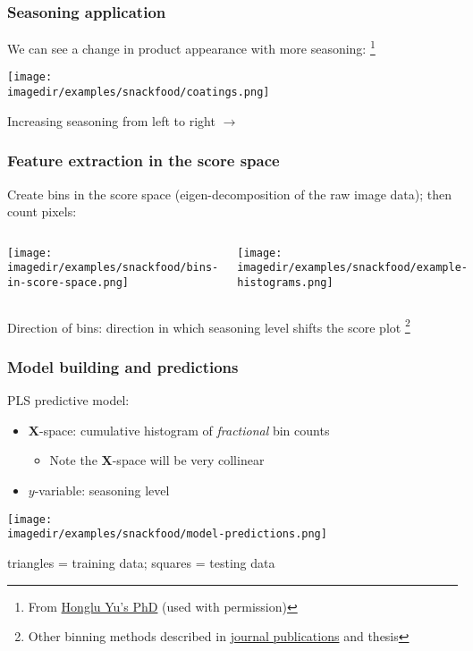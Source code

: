 \begin{frame}\frametitle{Seasoning application}
	We can see a change in product appearance with more seasoning:
	\footnote{From \href{http://literature.connectmv.com/item/60}{Honglu Yu's PhD} {\tiny (used with permission)}}
	\begin{center}
		\texttt{[image: \\imagedir/examples/snackfood/coatings.png]}
	\end{center}
	\vskip12pt
	Increasing seasoning from left to right $\longrightarrow$
\end{frame}

\begin{frame}\frametitle{Feature extraction in the score space {\color{myOrange}{(phase 1)}}}
	
	Create bins in the score space (eigen-decomposition of the raw image data); then count pixels:
	\begin{columns}
			\begin{center}
				\texttt{[image: \\imagedir/examples/snackfood/bins-in-score-space.png]}
			\end{center}
			\begin{center}
				\texttt{[image: \\imagedir/examples/snackfood/example-histograms.png]}
			\end{center}
	\end{columns}
	{\small Direction of bins: direction in which seasoning level shifts the score plot}
	\footnote{Other binning methods described in \href{http://literature.connectmv.com/item/119/}{journal publications} and thesis}
\end{frame}

\begin{frame}\frametitle{Model building and predictions {\color{myOrange}{(phase 1)}}}
	PLS predictive model:
	\begin{itemize}
		\item	$\mathbf{X}$-space: cumulative histogram of \emph{fractional} bin counts 
			\begin{itemize}
				\item	Note the $\mathbf{X}$-space will be very collinear
			\end{itemize}
		\item	$y$-variable: seasoning level
	\end{itemize}
	
	\begin{center}
		\texttt{[image: \\imagedir/examples/snackfood/model-predictions.png]}
	\end{center}
	{\scriptsize triangles = training data; squares = testing data}
\end{frame}

